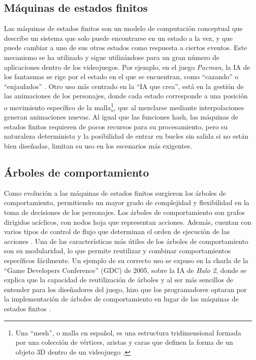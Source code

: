 \subsection{Máquinas de estados finitos}

Las máquinas de estados finitos son un modelo de computación conceptual que describe un sistema que solo puede encontrarse en un estado a la vez, y que puede cambiar a uno de sus otros estados como respuesta a ciertos eventos. Este mecanismo se ha utilizado y sigue utilizándose para un gran número de aplicaciones dentro de los videojuegos. Por ejemplo, en el juego \textit{Pac\-man}, la IA de los fantasmas se rige por el estado en el que se encuentran, como ``cazando'' o ``enjaulados'' \cite{mike_game_2016}. Otro uso más centrado en la ``IA que crea'', está en la gestión de las animaciones de los personajes, donde cada estado corresponde a una posición o movimiento específico de la malla\footnote{Una ``mesh'', o malla en español, es una estructura tridimensional formada por una colección de vértices, aristas y caras que definen la forma de un objeto 3D dentro de un videojuego \cite{universidad_europea_que_2025}.}, que al mezclarse mediante interpolaciones generan animaciones nuevas. Al igual que las funciones hash, las máquinas de estados finitos requieren de pocos recursos para su procesamiento, pero su naturaleza determinista y la posibilidad de entrar en bucles sin salida si no están bien diseñadas, limitan su uso en los escenarios más exigentes.

\subsection{Árboles de comportamiento}

Como evolución a las máquinas de estados finitos surgieron los árboles de comportamiento, permitiendo un mayor grado de complejidad y flexibilidad en la toma de decisiones de los personajes. Los árboles de comportamiento son grafos dirigidos acíclicos, con nodos hoja que representan acciones. Además, cuentan con varios tipos de control de flujo que determinan el orden de ejecución de las acciones \cite{epic_games_behavior_2024}. Una de las características más útiles de los árboles de comportamiento son su modularidad, lo que permite reutilizar y combinar comportamientos específicos fácilmente. Un ejemplo de su correcto uso se expuso en la charla de la ``Game Developers Conference'' (GDC) de 2005, sobre la IA de \textit{Halo 2}, donde se explica que la capacidad de reutilización de árboles y al ser más sencillos de entender para los diseñadores del juego, hizo que los programadores optaran por la implementación de árboles de comportamiento en lugar de las máquinas de estados finitos \cite{isla_managing_2005}.


